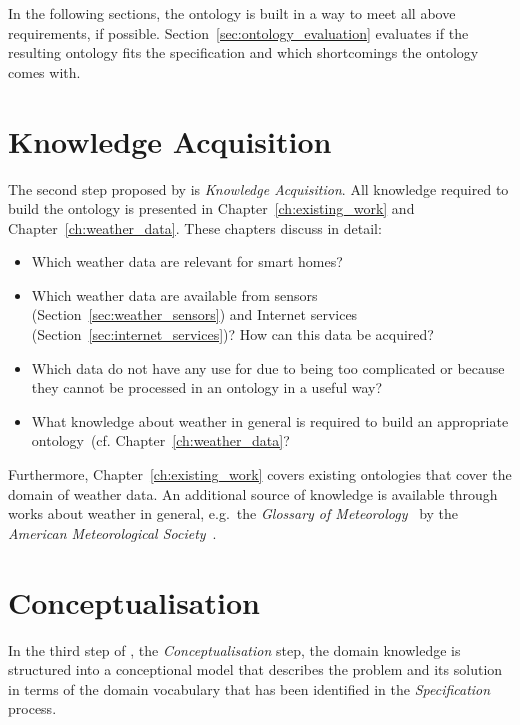 \vspace{.5cm}

In the following sections, the \smarthomeweather ontology is built in a way to meet all above requirements, if possible. Section~\ref{sec:ontology_evaluation} evaluates if the resulting ontology fits the specification and which shortcomings the ontology comes with.

\section{Knowledge Acquisition}

The second step proposed by \methontology is \emph{Knowledge Acquisition}. All knowledge required to build the \smarthomeweather ontology is presented in Chapter~\ref{ch:existing_work} and Chapter~\ref{ch:weather_data}. These chapters discuss in detail:

\begin{itemize}
  \item Which weather data are relevant for smart homes?
  \item Which weather data are available from sensors (Section~\ref{sec:weather_sensors}) and Internet services (Section~\ref{sec:internet_services})? How can this data be acquired?
  \item Which data do not have any use for \smarthomeweather due to being too complicated or because they cannot be processed in an ontology in a useful way?
  \item What knowledge about weather in general is required to build an appropriate ontology~(cf. Chapter~\ref{ch:weather_data}?
\end{itemize}

Furthermore, Chapter~\ref{ch:existing_work} covers existing ontologies that cover the domain of weather data. An additional source of knowledge is available through works about weather in general, e.g.\ the \emph{Glossary of Meteorology}~\cite{GlossaryOfMeteorology} by the \emph{American Meteorological Society}~\cite{AMS}.

\section{Conceptualisation}
\label{sec:ontology_concept}

In the third step of \methontology, the \emph{Conceptualisation} step, the domain knowledge is structured into a conceptional model that describes the problem and its solution in terms of the domain vocabulary that has been identified in the \emph{Specification} process.

